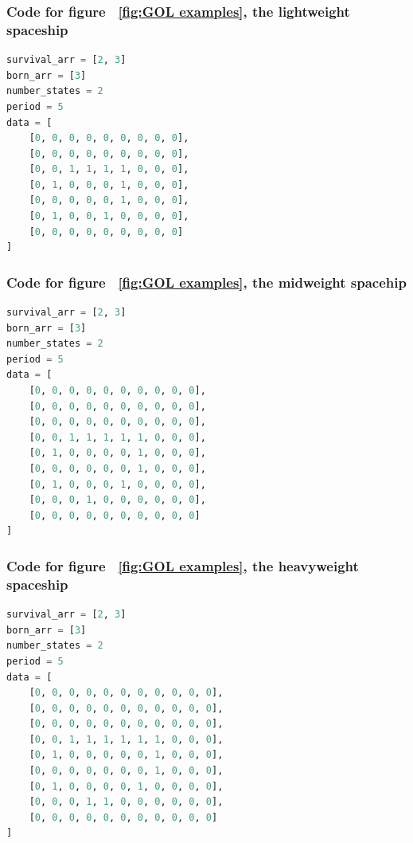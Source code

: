 \documentclass[12pt]{article}
\numberwithin{figure}{section} %
\begin{document}
\subsubsection{Code for figure ~\ref{fig:GOL examples}, the lightweight spaceship}
\label{subsubsection:lightweight spaceship}
\begin{lstlisting}[language = Python]
survival_arr = [2, 3]
born_arr = [3]
number_states = 2
period = 5
data = [
    [0, 0, 0, 0, 0, 0, 0, 0, 0], 
    [0, 0, 0, 0, 0, 0, 0, 0, 0], 
    [0, 0, 1, 1, 1, 1, 0, 0, 0], 
    [0, 1, 0, 0, 0, 1, 0, 0, 0], 
    [0, 0, 0, 0, 0, 1, 0, 0, 0], 
    [0, 1, 0, 0, 1, 0, 0, 0, 0], 
    [0, 0, 0, 0, 0, 0, 0, 0, 0]
]
\end{lstlisting}

\subsubsection{Code for figure ~\ref{fig:GOL examples}, the midweight spacehip}
\label{subsubsection:midweight spaceship}
\begin{lstlisting}[language = Python]
survival_arr = [2, 3]
born_arr = [3]
number_states = 2
period = 5
data = [
    [0, 0, 0, 0, 0, 0, 0, 0, 0, 0],
    [0, 0, 0, 0, 0, 0, 0, 0, 0, 0],
    [0, 0, 0, 0, 0, 0, 0, 0, 0, 0],
    [0, 0, 1, 1, 1, 1, 1, 0, 0, 0],
    [0, 1, 0, 0, 0, 0, 1, 0, 0, 0],
    [0, 0, 0, 0, 0, 0, 1, 0, 0, 0],
    [0, 1, 0, 0, 0, 1, 0, 0, 0, 0],
    [0, 0, 0, 1, 0, 0, 0, 0, 0, 0],
    [0, 0, 0, 0, 0, 0, 0, 0, 0, 0]
]
\end{lstlisting}

\subsubsection{Code for figure ~\ref{fig:GOL examples}, the heavyweight spaceship}
\label{subsubsection:heavyweight spaceship}
\begin{lstlisting}[language = Python]
survival_arr = [2, 3]
born_arr = [3]
number_states = 2
period = 5
data = [
    [0, 0, 0, 0, 0, 0, 0, 0, 0, 0, 0],
    [0, 0, 0, 0, 0, 0, 0, 0, 0, 0, 0],
    [0, 0, 0, 0, 0, 0, 0, 0, 0, 0, 0],
    [0, 0, 1, 1, 1, 1, 1, 1, 0, 0, 0],
    [0, 1, 0, 0, 0, 0, 0, 1, 0, 0, 0],
    [0, 0, 0, 0, 0, 0, 0, 1, 0, 0, 0],
    [0, 1, 0, 0, 0, 0, 1, 0, 0, 0, 0],
    [0, 0, 0, 1, 1, 0, 0, 0, 0, 0, 0],
    [0, 0, 0, 0, 0, 0, 0, 0, 0, 0, 0]
]
\end{lstlisting}
\end{document}
